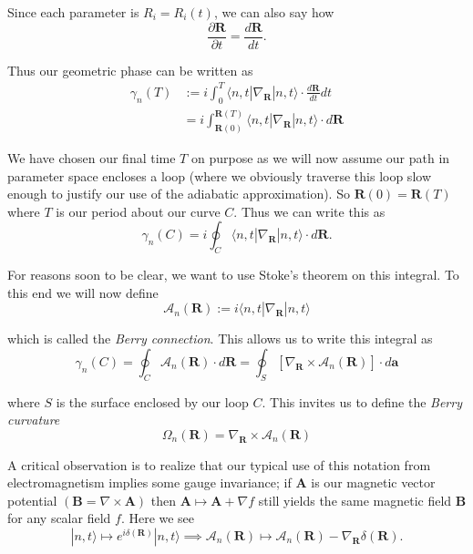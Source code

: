 \documentclass[12pt]{revtex4-2}
\begin{document}
Since each parameter is $R_i = R_i(t)$, we can also say how 
\begin{equation}
    \frac{\partial \mathbf{R}}{\partial t} = \frac{d\mathbf{R}}{dt}.
\end{equation}

Thus our geometric phase can be written as 
\begin{align}
    \gamma_n(T) &:= i \int_0^T \langle n,t | \nabla_\mathbf{R} | n,t \rangle \cdot \frac{d\mathbf{R}}{dt}dt \\
    &= i \int_{\mathbf{R}(0)}^{\mathbf{R}(T)} \langle n,t | \nabla_\mathbf{R} | n,t \rangle \cdot d\mathbf{R}
\end{align}

We have chosen our final time $T$ on purpose as we will now assume our path in parameter space encloses a loop (where we obviously traverse this loop slow enough to justify our use of the adiabatic approximation).  So $\mathbf{R}(0) = \mathbf{R}(T)$ where $T$ is our period about our curve $C$.  Thus we can write this as 
\begin{equation}
    \gamma_n(C) = i\oint_C \langle n,t | \nabla_\mathbf{R} | n,t \rangle \cdot d\mathbf{R}.
\end{equation}

For reasons soon to be clear, we want to use Stoke's theorem on this integral.  To this end we will now define 
\begin{equation}\label{eqn:berry_connection}
    \mathcal{A}_n(\mathbf{R}) := i\langle n,t | \nabla_\mathbf{R} | n,t \rangle
\end{equation}

which is called the \emph{Berry connection}.  This allows us to write this integral as 
\begin{equation}\label{eqn:berry_phase}
    \boxed{\gamma_n(C) = \oint_C \mathcal{A}_n(\mathbf{R}) \cdot d\mathbf{R} = \oint_S [\nabla_\mathbf{R} \times \mathcal{A}_n(\mathbf{R})] \cdot d\mathbf{a}}
\end{equation}

where $S$ is the surface enclosed by our loop $C$.  This invites us to define the \emph{Berry curvature}
\begin{equation}\label{eqn:berry_curvature}
    \boxed{\Omega_n(\mathbf{R}) = \nabla_\mathbf{R} \times \mathcal{A}_n(\mathbf{R})}
\end{equation}

A critical observation is to realize that our typical use of this notation from electromagnetism implies some gauge invariance; if $\mathbf{A}$ is our magnetic vector potential $(\mathbf{B} = \nabla\times\mathbf{A})$ then $\mathbf{A} \mapsto \mathbf{A} + \nabla f$ still yields the same magnetic field $\mathbf{B}$ for any scalar field $f$.  Here we see
\begin{equation}
    |n,t\rangle \mapsto e^{i\delta(\mathbf{R})}|n,t\rangle \implies \mathcal{A}_n(\mathbf{R}) \mapsto \mathcal{A}_n(\mathbf{R}) - \nabla_\mathbf{R}\delta(\mathbf{R}).
\end{equation}
\end{document}
